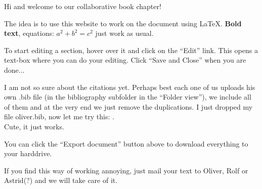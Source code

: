 Hi and welcome to our collaborative book chapter!  

The idea is to use this website to work on the document using \LaTeX.  \textbf{Bold text}, equations: $a^2+b^2=c^2$ just work as usual.  

To start editing a section, hover over it and click on the ``Edit'' link.  This opens a text-box where you can do your editing.  Click ``Save and Close'' when you are done...

I am not so sure about the citations yet.  Perhaps best each one of us uploads his own .bib file (in the bibliography subfolder in the ``Folder view''), we include all of them and at the very end we just remove the duplications.  
I just dropped my file oliver.bib, now let me try this: \cite{buehler2012}.\\
Cute, it just works.  

You can click the ``Export document'' button above to download everything to your harddrive.  

If you find this way of working annoying, just mail your text to Oliver, Rolf or Astrid(?) and we will take care of it.  